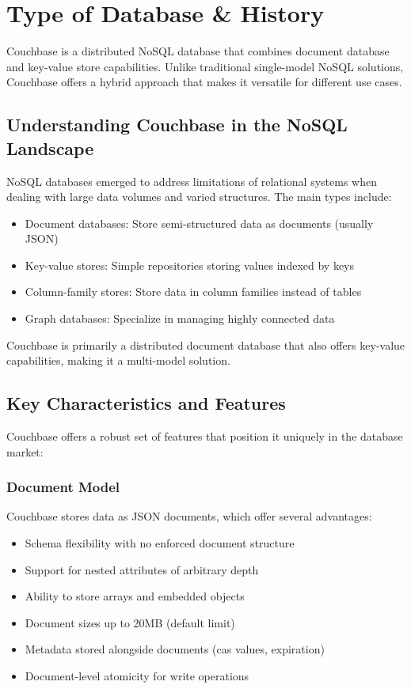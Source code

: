 \chapter{Type of Database \& History}

Couchbase is a distributed NoSQL database that combines document database and key-value store capabilities. Unlike traditional single-model NoSQL solutions, Couchbase offers a hybrid approach that makes it versatile for different use cases.

\section{Understanding Couchbase in the NoSQL Landscape}

NoSQL databases emerged to address limitations of relational systems when dealing with large data volumes and varied structures. The main types include:

\begin{itemize}
  \item Document databases: Store semi-structured data as documents (usually JSON)
  \item Key-value stores: Simple repositories storing values indexed by keys
  \item Column-family stores: Store data in column families instead of tables
  \item Graph databases: Specialize in managing highly connected data
\end{itemize}

Couchbase is primarily a distributed document database that also offers key-value capabilities, making it a multi-model solution.

\section{Key Characteristics and Features}

Couchbase offers a robust set of features that position it uniquely in the database market:

\subsection{Document Model}
Couchbase stores data as JSON documents, which offer several advantages:
\begin{itemize}
  \item Schema flexibility with no enforced document structure
  \item Support for nested attributes of arbitrary depth
  \item Ability to store arrays and embedded objects
  \item Document sizes up to 20MB (default limit)
  \item Metadata stored alongside documents (cas values, expiration)
  \item Document-level atomicity for write operations
\end{itemize}

